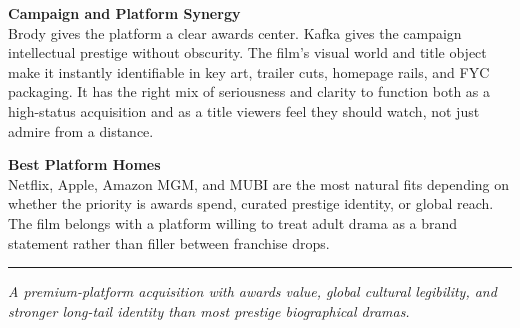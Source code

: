 \documentclass[11pt,letterpaper]{article}
\begin{document}
\vspace{2pt}

\textbf{Campaign and Platform Synergy}\\
Brody gives the platform a clear awards center. Kafka gives the campaign intellectual prestige without obscurity. The film's visual world and title object make it instantly identifiable in key art, trailer cuts, homepage rails, and FYC packaging. It has the right mix of seriousness and clarity to function both as a high-status acquisition and as a title viewers feel they should watch, not just admire from a distance.

\vspace{2pt}

\textbf{Best Platform Homes}\\
Netflix, Apple, Amazon MGM, and MUBI are the most natural fits depending on whether the priority is awards spend, curated prestige identity, or global reach. The film belongs with a platform willing to treat adult drama as a brand statement rather than filler between franchise drops.

\vspace{4pt}
\textcolor{sectionrule}{\rule{\textwidth}{0.5pt}}
\vspace{2pt}
\begin{center}
{\small\color{kafkalight}\textit{A premium-platform acquisition with awards value, global cultural legibility, and stronger long-tail identity than most prestige biographical dramas.}}
\end{center}
\end{document}
